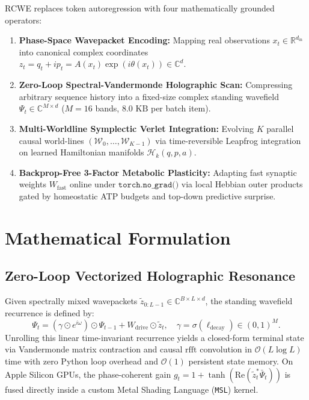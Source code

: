 \documentclass[11pt,twocolumn]{article}
\begin{document}
RCWE replaces token autoregression with four mathematically grounded operators:
\begin{enumerate}
  \item \textbf{Phase-Space Wavepacket Encoding:} Mapping real observations $x_t \in \mathbb{R}^{d_{\text{in}}}$ into canonical complex coordinates $z_t = q_t + i p_t = A(x_t)\exp(i\theta(x_t)) \in \mathbb{C}^{d}$.
  \item \textbf{Zero-Loop Spectral-Vandermonde Holographic Scan:} Compressing arbitrary sequence history into a fixed-size complex standing wavefield $\Psi_t \in \mathbb{C}^{M \times d}$ ($M=16$ bands, $8.0\text{ KB}$ per batch item).
  \item \textbf{Multi-Worldline Symplectic Verlet Integration:} Evolving $K$ parallel causal world-lines $(\mathcal{W}_0, \dots, \mathcal{W}_{K-1})$ via time-reversible Leapfrog integration on learned Hamiltonian manifolds $\mathcal{H}_k(q, p, a)$.
  \item \textbf{Backprop-Free 3-Factor Metabolic Plasticity:} Adapting fast synaptic weights $W_{\text{fast}}$ online under $\texttt{torch.no\_grad()}$ via local Hebbian outer products gated by homeostatic ATP budgets and top-down predictive surprise.
\end{enumerate}

\section{Mathematical Formulation}

\subsection{Zero-Loop Vectorized Holographic Resonance}
Given spectrally mixed wavepackets $\tilde{z}_{0:L-1} \in \mathbb{C}^{B \times L \times d}$, the standing wavefield recurrence is defined by:
\begin{equation}
  \Psi_t = \left(\gamma \odot e^{i\omega}\right) \odot \Psi_{t-1} + W_{\text{drive}} \odot \tilde{z}_t, \quad \gamma = \sigma(\ell_{\text{decay}}) \in (0, 1)^M.
\end{equation}
Unrolling this linear time-invariant recurrence yields a closed-form terminal state via Vandermonde matrix contraction and causal $\text{rfft}$ convolution in $\mathcal{O}(L \log L)$ time with zero Python loop overhead and $\mathcal{O}(1)$ persistent state memory. On Apple Silicon GPUs, the phase-coherent gain $g_t = 1 + \tanh(\text{Re}(\tilde{z}_t^* \bar{\Psi}_t))$ is fused directly inside a custom Metal Shading Language (\texttt{MSL}) kernel.
\end{document}
